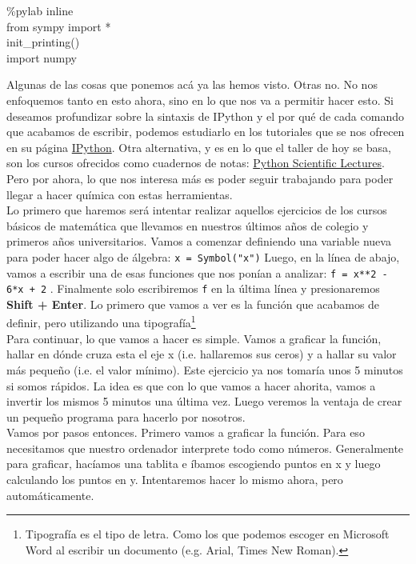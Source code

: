 \documentclass[10pt,letterpaper]{article}
\newcommand{\inlinecode}[1]{
\colorbox{light-gray}{\texttt{#1}}
}
\newenvironment{Code}
{
\begin{lrbox}{\selvestebox}%
\begin{minipage}{\dimexpr\columnwidth-2\fboxsep\relax}
\fontfamily{\ttdefault}\selectfont
}
{\end{minipage}\end{lrbox}%
\begin{center}
\colorbox{light-gray}{\usebox{\selvestebox}}
\end{center}
}
\begin{document}
\begin{Code}
\%pylab inline\\
from sympy import *\\
init\_printing()\\
import numpy
\end{Code}

Algunas de las cosas que ponemos ac\'a ya las hemos visto. Otras no. No nos enfoquemos tanto en esto ahora, sino en lo que nos va a permitir hacer esto. Si deseamos profundizar sobre la sintaxis de IPython y el por qu\'e de cada comando que acabamos de escribir, podemos estudiarlo en los tutoriales que se nos ofrecen en su p\'agina \href{http://ipython.org/}{IPython}. Otra alternativa, y es en lo que el taller de hoy se basa, son los cursos ofrecidos como cuadernos de notas: \href{https://github.com/jrjohansson/scientific-python-lectures}{Python Scientific Lectures}. Pero por ahora, lo que nos interesa m\'as es poder seguir trabajando para poder llegar a hacer qu\'imica con estas herramientas.\\

Lo primero que haremos ser\'a intentar realizar aquellos ejercicios de los cursos b\'asicos de matem\'atica que llevamos en nuestros \'ultimos a\~nos de colegio y primeros a\~nos universitarios. Vamos a comenzar definiendo una variable nueva para poder hacer algo de \'algebra: \inlinecode{x = Symbol("x")} Luego, en la l\'inea de abajo, vamos a escribir una de esas funciones que nos pon\'ian a analizar: \inlinecode{f = x**2 - 6*x + 2}. Finalmente solo escribiremos \inlinecode{f} en la \'ultima l\'inea y presionaremos \textbf{Shift + Enter}. Lo primero que vamos a ver es la funci\'on que acabamos de definir, pero utilizando una tipograf\'ia\footnote{Tipograf\'ia es el tipo de letra. Como los que podemos escoger en Microsoft Word al escribir un documento (e.g. Arial, Times New Roman).}\\

Para continuar, lo que vamos a hacer es simple. Vamos a graficar la funci\'on, hallar en d\'onde cruza esta el eje x (i.e. hallaremos sus ceros) y a hallar su valor m\'as peque\~no (i.e. el valor m\'inimo). Este ejercicio ya nos tomar\'ia unos 5 minutos si somos r\'apidos. La idea es que con lo que vamos a hacer ahorita, vamos a invertir los mismos 5 minutos una \'ultima vez. Luego veremos la ventaja de crear un peque\~no programa para hacerlo por nosotros.\\

Vamos por pasos entonces. Primero vamos a graficar la funci\'on. Para eso necesitamos que nuestro ordenador interprete todo como n\'umeros. Generalmente para graficar, hac\'iamos una tablita e \'ibamos escogiendo puntos en x y luego calculando los puntos en y. Intentaremos hacer lo mismo ahora, pero autom\'aticamente.
\end{document}
